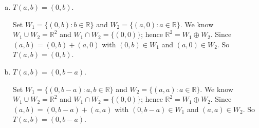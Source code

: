 \begin{Exercise}
\begin{enumerate}[(a)]
\item
\begin{answer}
$T(a,b) = (0,b)$.
\end{answer}
\begin{solution}
Set $W_1 = \{(0,b):b\in\mathbb{R}\}$ and $W_2 = \{(a,0):a\in\mathbb{R}\}$. We know $W_1\cup W_2 = \mathbb{R}^2$ and $W_1\cap W_2 = \{(0,0)\}$; hence $\mathbb{R}^2 = W_1\oplus W_2$. Since $(a,b) = (0,b) + (a,0)$ with $(0,b)\in W_1$ and $(a,0)\in W_2$. So $T(a,b) = (0,b)$.
\end{solution}

\item
\begin{answer}
$T(a,b) = (0,b-a)$.
\end{answer}
\begin{solution}
Set $W_1 = \{(0,b-a):a,b\in\mathbb{R}\}$ and $W_2 = \{(a,a):a\in\mathbb{R}\}$. We know $W_1\cup W_2 = \mathbb{R}^2$ and $W_1\cap W_2 = \{(0,0)\}$; hence $\mathbb{R}^2 = W_1\oplus W_2$. Since $(a,b) = (0,b-a) + (a,a)$ with $(0,b-a)\in W_1$ and $(a,a)\in W_2$. So $T(a,b) = (0,b-a)$.
\end{solution}
\end{enumerate}
\end{Exercise}
